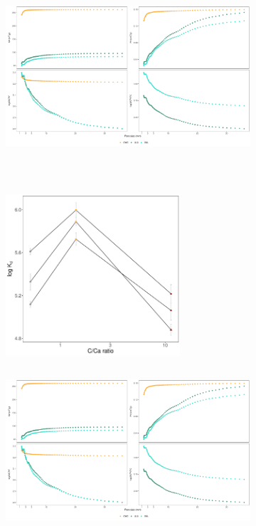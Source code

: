\begin{figure}[t!]
    \centering
    \begin{subfigure}[t]{0.5\textwidth}
        \centering
        \includegraphics[height=6cm]{R/figs/Kd_1ugL_Ca.pdf}
        \caption{}
        \label{subfig:Ca}
    \end{subfigure}%
    ~ 
    \begin{subfigure}[t]{0.5\textwidth}
        \centering
        \includegraphics[height=6cm]{R/figs/Kd_1ugL_C_Ca.pdf}
        \caption{}
        \label{subfig:C_Ca}
    \end{subfigure}
    \medskip
    \begin{subfigure}[t]{0.5\textwidth}
        \centering
        \includegraphics[height=6cm]{R/figs/Kd_1ugL_Fe.pdf}
        \caption{}
        \label{subfig:Fe}

\end{subfigure}
\end{figure}
